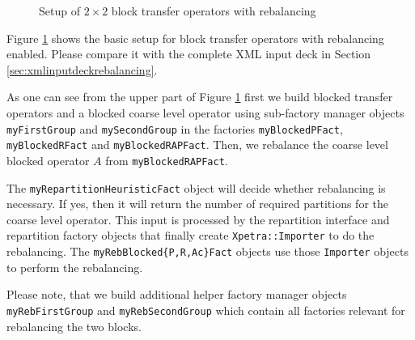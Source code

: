 \documentclass[10pt,fleqn]{book}
\begin{document}
\begin{figure}
\caption{Setup of $2\times 2$ block transfer operators with rebalancing}
\label{fig:transferoperatorsetuprebalancing}
\end{figure}

Figure \ref{fig:transferoperatorsetuprebalancing} shows the basic setup for block transfer operators with rebalancing enabled. Please compare it with the complete XML input deck in Section \ref{sec:xmlinputdeckrebalancing}.

As one can see from the upper part of Figure \ref{fig:transferoperatorsetuprebalancing} first we build blocked transfer operators and a blocked coarse level operator using sub-factory manager objects \texttt{myFirstGroup} and \texttt{mySecondGroup} in the factories \texttt{myBlockedPFact}, \texttt{myBlockedRFact} and \texttt{myBlockedRAPFact}. Then, we rebalance the coarse level blocked operator $A$ from \texttt{myBlockedRAPFact}.

The \texttt{myRepartitionHeuristicFact} object will decide whether rebalancing is necessary. If yes, then it will return the number of required partitions for the coarse level operator. This input is processed by the repartition interface and repartition factory objects that finally create \texttt{Xpetra::Importer} to do the rebalancing. The \texttt{myRebBlocked\{P,R,Ac\}Fact} objects use those \texttt{Importer} objects to perform the rebalancing.

Please note, that we build additional helper factory manager objects \texttt{myRebFirstGroup} and \texttt{myRebSecondGroup} which contain all factories relevant for rebalancing the two blocks.
\end{document}
